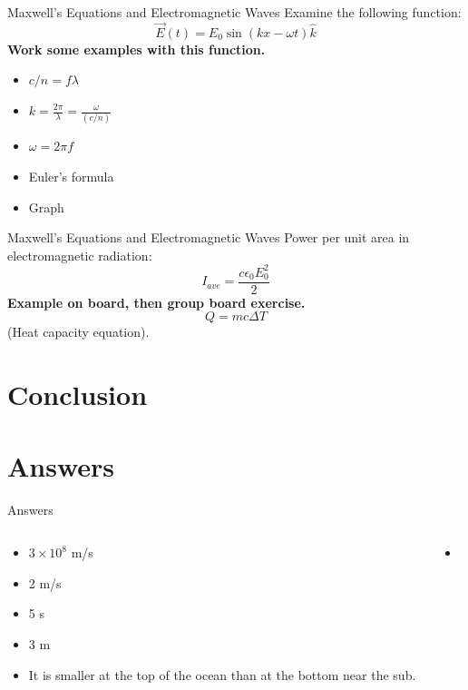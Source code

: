 \documentclass{beamer}
\begin{document}
\begin{frame}{Maxwell's Equations and Electromagnetic Waves}
Examine the following function:
\begin{equation}
\vec{E}(t) = E_0 \sin\left(k x - \omega t\right) \hat{k}
\end{equation}
\textbf{Work some examples with this function.}
\begin{itemize}
\item $c/n = f \lambda$
\item $k = \frac{2\pi}{\lambda} = \frac{\omega}{(c/n)}$
\item $\omega = 2\pi f$
\item Euler's formula
\item Graph
\end{itemize}
\end{frame}

\begin{frame}{Maxwell's Equations and Electromagnetic Waves}
Power per unit area in electromagnetic radiation:
\begin{equation}
I_{ave} = \frac{c\epsilon_0 E_0^2}{2}
\end{equation}
\textbf{Example on board, then group board exercise.}
\begin{equation}
Q = m c \Delta T
\end{equation}
(Heat capacity equation).
\end{frame}

\section{Conclusion}

\section{Answers}

\begin{frame}{Answers}
\tiny
\begin{columns}[T]
\begin{column}{0.5\textwidth}
\begin{itemize}
\item $3 \times 10^{8}$ m/s
\item 2 m/s
\item 5 s
\item 3 m
\item It is smaller at the top of the ocean than at the bottom near the sub.
\end{itemize}
\end{column}
\begin{column}{0.5\textwidth}
\begin{itemize}
\item 
\end{itemize}
\end{column}
\end{columns}
\end{frame}
\end{document}
